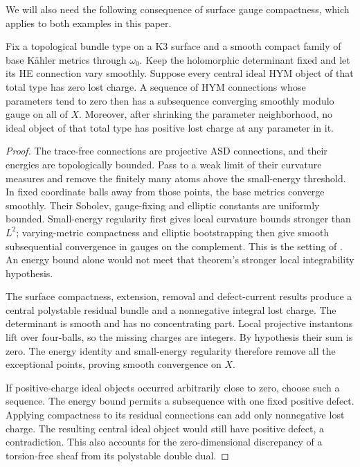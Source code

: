 We will also need the following consequence of surface gauge
compactness, which applies to both examples in this paper.

\begin{lemma}\label{lem:no-charge-compactness}
Fix a topological bundle type on a K3 surface and a smooth compact
family of base K\"ahler metrics through $\omega_0$. Keep the
holomorphic determinant fixed and let its HE connection vary
smoothly. Suppose every central ideal HYM object of that total
type has zero lost charge. A sequence of HYM connections whose
parameters tend to zero then has a subsequence converging
smoothly modulo gauge on all of $X$. Moreover, after shrinking
the parameter neighborhood, no ideal object of that total type
has positive lost charge at any parameter in it.
\end{lemma}

\begin{proof}
The trace-free connections are projective ASD connections, and
their energies are topologically bounded. Pass to a weak limit
of their curvature measures and remove the finitely many atoms
above the small-energy threshold. In fixed coordinate balls
away from those points, the base metrics converge smoothly.
Their Sobolev, gauge-fixing and elliptic constants are uniformly
bounded. Small-energy regularity first gives local curvature
bounds stronger than $L^2$; varying-metric compactness and
elliptic bootstrapping then give smooth subsequential convergence
in gauges on the complement. This is the setting of
\cite[Introduction, Theorem~E$'$, and Theorem~10.3]{wehrheim}.
An energy bound alone would not meet that theorem's stronger
local integrability hypothesis.

The surface compactness, extension, removal and defect-current
results \cite[Section~3.1, Theorems~3.3, 3.5--3.7 and~3.10]{gstw}
produce a central polystable residual bundle and a nonnegative
integral lost charge. The determinant is smooth and has no
concentrating part. Local projective instantons lift over
four-balls, so the missing charges are integers. By hypothesis
their sum is zero. The energy identity and small-energy
regularity therefore remove all the exceptional points, proving
smooth convergence on $X$.

If positive-charge ideal objects occurred arbitrarily close to
zero, choose such a sequence. The energy bound permits a
subsequence with one fixed positive defect. Applying compactness
to its residual connections can add only nonnegative lost
charge. The resulting central ideal object would still have
positive defect, a contradiction. This also accounts for the
zero-dimensional discrepancy of a torsion-free sheaf from its
polystable double dual.
\end{proof}

